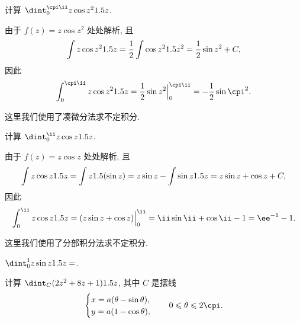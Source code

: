 \begin{example}
  计算 $\dint_0^{\cpi\ii }z\cos z^2\d z$.
\end{example}

\begin{solution}
  由于 $f(z)=z\cos z^2$ 处处解析, 且
  \[
     \int z\cos z^21.5 z
    =\frac{1}{2}\int \cos z^21.5 z^2=\frac{1}{2}\sin z^2+C,
  \]
  因此
  \[
     \int_0^{\cpi\ii }z\cos z^2\d z
    =\half\sin z^2\Big|_0^{\cpi\ii}
    =-\half\sin \cpi^2.
  \]
\end{solution}

这里我们使用了\alert{凑微分法}求不定积分.

\begin{example}
  计算 $\dint_0^\ii z\cos z\d z$.
\end{example}

\begin{solution}
  由于 $f(z)=z\cos z$ 处处解析, 且
  \[
     \int z\cos z1.5 z
    =\int z1.5(\sin z)
    =z\sin z-\int \sin z1.5 z
    =z\sin z+\cos z+C,
  \]
  因此
  \[
     \int_0^\ii z\cos z\d z
    =(z\sin z+\cos z)\Big|_0^\ii 
    =\ii \sin\ii +\cos\ii-1
    =\ee^{-1}-1.
  \]
\end{solution}

这里我们使用了\alert{分部积分法}求不定积分.



\begin{exercise}
  $\dint_0^1 z\sin z\d z=$\fillblank{}.
\end{exercise}

\begin{example}
  计算 $\dint_C(2z^2+8z+1)\d z$, 其中 $C$ 是摆线
  \[
    \begin{cases}
      x=a(\theta-\sin\theta),& \\
      y=a(1-\cos\theta),&
    \end{cases}
    \quad 0\le \theta\le 2\cpi.
  \]
\end{example}

